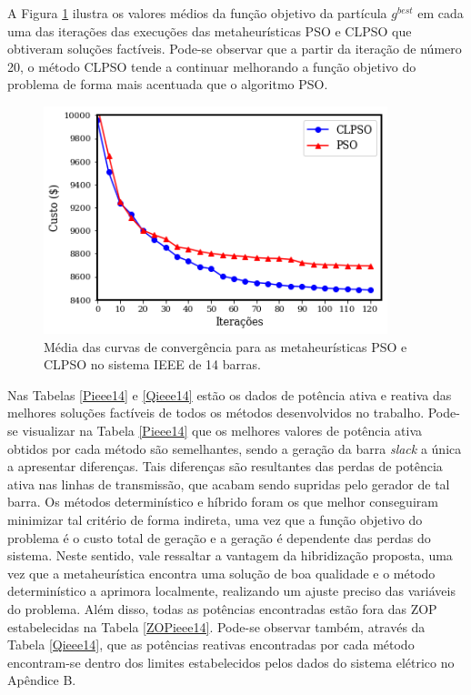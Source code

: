 \documentclass[
	12pt,				%
	openany,			%
	twoside,			%
	a4paper,			%
	chapter=TITLE,		%
	section=Title,		%
	subsection=Title,	%
	subsubsection=Title,%
	english,			%
	french,				%
	spanish,			%
	brazil			%
	]{abntex2}
\begin{document}
\begin{ERRATA}
A Figura \ref{ieee_14_curves} ilustra os valores médios da função objetivo da partícula $g^{best}$ em cada
uma das iterações das execuções das metaheurísticas PSO e CLPSO que obtiveram soluções factíveis. Pode-se observar que a partir da iteração de número 20, o método CLPSO tende a continuar melhorando a função objetivo do problema de forma mais acentuada que o algoritmo PSO.

\begin{figure}[h!]
    \caption{\label{ieee_14_curves}Média das curvas de convergência para as metaheurísticas PSO e CLPSO no sistema IEEE de 14 barras.}
    \centering
    \includegraphics[width=100mm]{images/custo_medio_ieee14.png}
   
\end{figure}

Nas Tabelas \ref{Pieee14} e \ref{Qieee14} estão os dados de potência ativa e reativa das melhores soluções factíveis de todos os métodos desenvolvidos no trabalho. Pode-se visualizar na Tabela \ref{Pieee14} que os melhores valores de potência ativa obtidos por cada método são semelhantes, sendo a geração da barra \emph{slack} a única a apresentar diferenças. Tais diferenças são resultantes das perdas de potência ativa nas linhas de transmissão, que acabam sendo supridas pelo gerador de tal barra. Os métodos determinístico e híbrido foram os que melhor conseguiram minimizar tal critério de forma indireta, uma vez que a função objetivo do problema é o custo total de geração e a geração é dependente das perdas do sistema. Neste sentido, vale ressaltar a vantagem da hibridização proposta, uma vez que a metaheurística encontra uma solução de boa qualidade e o método determinístico a aprimora localmente, realizando um ajuste preciso das variáveis do problema. Além disso, todas as potências encontradas estão fora das ZOP estabelecidas na Tabela \ref{ZOPieee14}. Pode-se observar também, através da Tabela \ref{Qieee14}, que as potências reativas encontradas por cada método encontram-se dentro dos limites estabelecidos pelos dados do sistema elétrico no Apêndice B.



\end{ERRATA}
\end{document}
